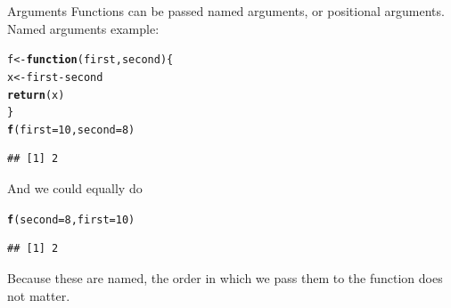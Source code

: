 \documentclass{beamer}\usepackage[]{graphicx}\usepackage[]{color}
\makeatletter
\newcommand{\hlnum}[1]{\textcolor[rgb]{0.686,0.059,0.569}{#1}}%
\newcommand{\hlopt}[1]{\textcolor[rgb]{0,0,0}{#1}}%
\newcommand{\hlstd}[1]{\textcolor[rgb]{0.345,0.345,0.345}{#1}}%
\newcommand{\hlkwa}[1]{\textcolor[rgb]{0.161,0.373,0.58}{\textbf{#1}}}%
\newcommand{\hlkwb}[1]{\textcolor[rgb]{0.69,0.353,0.396}{#1}}%
\newcommand{\hlkwc}[1]{\textcolor[rgb]{0.333,0.667,0.333}{#1}}%
\newcommand{\hlkwd}[1]{\textcolor[rgb]{0.737,0.353,0.396}{\textbf{#1}}}%
\newenvironment{kframe}{%
 \def\at@end@of@kframe{}%
 \ifinner\ifhmode%
  \def\at@end@of@kframe{\end{minipage}}%
  \begin{minipage}{\columnwidth}%
 \fi\fi%
 \def\FrameCommand##1{\hskip\@totalleftmargin \hskip-\fboxsep
 \colorbox{shadecolor}{##1}\hskip-\fboxsep
     \hskip-\linewidth \hskip-\@totalleftmargin \hskip\columnwidth}%
 \MakeFramed {\advance\hsize-\width
   \@totalleftmargin\z@ \linewidth\hsize
   \@setminipage}}%
 {\par\unskip\endMakeFramed%
 \at@end@of@kframe}
\newenvironment{knitrout}{}{} %
\makeatother
\begin{document}
\begin{frame}[fragile]{Arguments}
Functions can be passed named arguments, or positional arguments.
\linebreak
Named arguments example:
\begin{knitrout}
\color{fgcolor}\begin{kframe}
\begin{alltt}
\hlstd{f} \hlkwb{<-} \hlkwa{function}\hlstd{(}\hlkwc{first}\hlstd{,} \hlkwc{second}\hlstd{) \{}
    \hlstd{x} \hlkwb{<-} \hlstd{first} \hlopt{-} \hlstd{second}
    \hlkwd{return}\hlstd{(x)}
\hlstd{\}}
\hlkwd{f}\hlstd{(}\hlkwc{first} \hlstd{=} \hlnum{10}\hlstd{,} \hlkwc{second} \hlstd{=} \hlnum{8}\hlstd{)}
\end{alltt}
\begin{verbatim}
## [1] 2
\end{verbatim}
\end{kframe}
\end{knitrout}

And we could equally do
\begin{knitrout}
\color{fgcolor}\begin{kframe}
\begin{alltt}
\hlkwd{f}\hlstd{(}\hlkwc{second} \hlstd{=} \hlnum{8}\hlstd{,} \hlkwc{first} \hlstd{=} \hlnum{10}\hlstd{)}
\end{alltt}
\begin{verbatim}
## [1] 2
\end{verbatim}
\end{kframe}
\end{knitrout}

Because these are named, the order in which we pass them to the function does not matter.
\end{frame}
\end{document}
